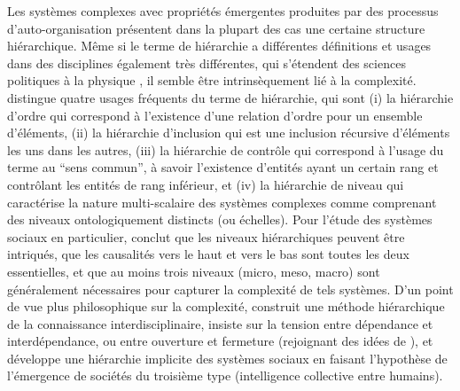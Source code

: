 \documentclass[english,fleqn,allpages]{ISTE_science}[2018/07/30]
\begin{document}
{Les systèmes complexes avec propriétés émergentes produites par des processus d'auto-organisation présentent dans la plupart des cas une certaine structure hiérarchique. Même si le terme de hiérarchie a différentes définitions et usages dans des disciplines également très différentes, qui s'étendent des sciences politiques \citep{crumley1987dialectical} à la physique \citep{10.1371/journal.pone.0033799}, il semble être intrinsèquement lié à la complexité. \cite{lane2006hierarchy} distingue quatre usages fréquents du terme de hiérarchie, qui sont (i) la hiérarchie d'ordre qui correspond à l'existence d'une relation d'ordre pour un ensemble d'éléments, (ii) la hiérarchie d'inclusion qui est une inclusion récursive d'éléments les uns dans les autres, (iii) la hiérarchie de contrôle qui correspond à l'usage du terme au ``sens commun'', à savoir l'existence d'entités ayant un certain rang et contrôlant les entités de rang inférieur, et (iv) la hiérarchie de niveau qui caractérise la nature multi-scalaire des systèmes complexes comme comprenant des niveaux ontologiquement distincts (ou échelles). Pour l'étude des systèmes sociaux en particulier, \cite{lane2006hierarchy} conclut que les niveaux hiérarchiques peuvent être intriqués, que les causalités vers le haut et vers le bas sont toutes les deux essentielles, et que au moins trois niveaux (micro, meso, macro) sont généralement nécessaires pour capturer la complexité de tels systèmes. D'un point de vue plus philosophique sur la complexité, \cite{morin1980methode} construit une méthode hiérarchique de la connaissance interdisciplinaire, insiste sur la tension entre dépendance et interdépendance, ou entre ouverture et fermeture (rejoignant des idées de \cite{holland2012signals}), et développe une hiérarchie implicite des systèmes sociaux en faisant l'hypothèse de l'émergence de sociétés du troisième type (intelligence collective entre humains). %
}
\end{document}
